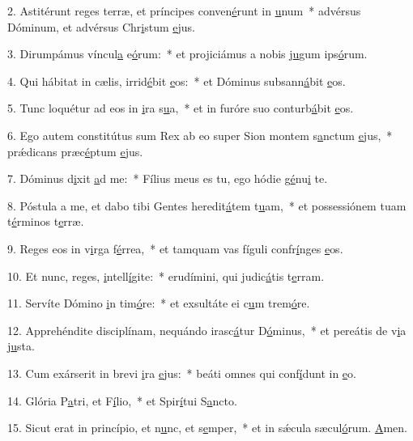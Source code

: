2. Astitérunt reges terræ, et príncipes conven\uline{é}runt in \uline{u}num~* advérsus Dóminum, et advérsus Chr\uline{i}stum \uline{e}jus.\par 
3. Dirumpámus víncul\uline{a} e\uline{ó}rum:~* et projiciámus a nobis j\uline{u}gum ips\uline{ó}rum.\par 
4. Qui hábitat in cælis, irrid\uline{é}bit \uline{e}os:~* et Dóminus subsann\uline{á}bit \uline{e}os.\par 
5. Tunc loquétur ad eos in \uline{i}ra s\uline{u}a,~* et in furóre suo conturb\uline{á}bit \uline{e}os.\par 
6. Ego autem constitútus sum Rex ab eo super Sion montem s\uline{a}nctum \uline{e}jus,~* prǽdicans præc\uline{é}ptum \uline{e}jus.\par 
7. Dóminus d\uline{i}xit \uline{a}d me:~* Fílius meus es tu, ego hódie g\uline{é}nu\uline{i} te.\par 
8. Póstula a me, et dabo tibi Gentes heredit\uline{á}tem t\uline{u}am,~* et possessiónem tuam t\uline{é}rminos t\uline{e}rræ.\par 
9. Reges eos in v\uline{i}rga f\uline{é}rrea,~* et tamquam vas fíguli confr\uline{í}nges \uline{e}os.\par 
10. Et nunc, reges, \uline{i}ntell\uline{í}gite:~* erudímini, qui judic\uline{á}tis t\uline{e}rram.\par 
11. Servíte Dómino \uline{i}n tim\uline{ó}re:~* et exsultáte ei c\uline{u}m trem\uline{ó}re.\par 
12. Apprehéndite disciplínam, nequándo irasc\uline{á}tur D\uline{ó}minus,~* et pereátis de v\uline{i}a j\uline{u}sta.\par 
13. Cum exárserit in brevi \uline{i}ra \uline{e}jus:~* beáti omnes qui conf\uline{í}dunt in \uline{e}o.\par 
14. Glória P\uline{a}tri, et F\uline{í}lio,~* et Spir\uline{í}tui S\uline{a}ncto.\par 
15. Sicut erat in princípio, et n\uline{u}nc, et s\uline{e}mper,~* et in sǽcula sæcul\uline{ó}rum. \uline{A}men.\par 
